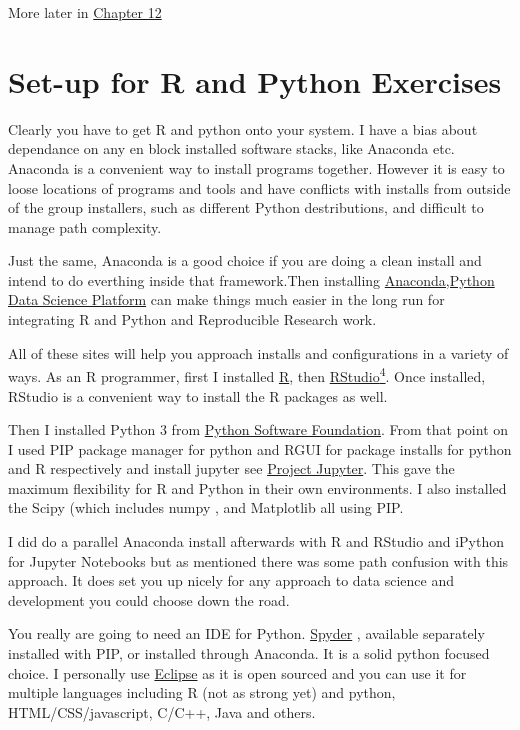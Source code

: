 \documentclass[]{book}
\theoremstyle{definition}
\theoremstyle{definition}
\theoremstyle{definition}
\theoremstyle{remark}
\begin{document}
More later in \href{12-OO_Programming.Rmd}{Chapter 12}

\chapter{Set-up for R and Python
Exercises}\label{set-up-for-r-and-python-exercises}

Clearly you have to get R and python onto your system. I have a bias
about dependance on any en block installed software stacks, like
Anaconda etc. Anaconda is a convenient way to install programs together.
However it is easy to loose locations of programs and tools and have
conflicts with installs from outside of the group installers, such as
different Python destributions, and difficult to manage path complexity.

Just the same, Anaconda is a good choice if you are doing a clean
install and intend to do everthing inside that framework.Then installing
\href{https://www.anaconda.com/}{Anaconda,Python Data Science Platform}
can make things much easier in the long run for integrating R and Python
and Reproducible Research work.

All of these sites will help you approach installs and configurations in
a variety of ways. As an R programmer, first I installed
\href{https://www.r-project.org/}{R}, then
\href{https://www.rstudio.com/}{RStudio\textsuperscript{4}}. Once
installed, RStudio is a convenient way to install the R packages as
well.

Then I installed Python 3 from \href{https://www.python.org/}{Python
Software Foundation}. From that point on I used PIP package manager for
python and RGUI for package installs for python and R respectively and
install jupyter see \href{http://jupyter.org/install}{Project
Jupyter}. This gave the maximum flexibility for R
and Python in their own environments. I also installed the Scipy
 (which includes numpy , and Matplotlib
 all using PIP.

I did do a parallel Anaconda  install afterwards with R
and RStudio  and iPython  for Jupyter
Notebooks but as mentioned there was some path confusion with this
approach. It does set you up nicely for any approach to data science and
development you could choose down the road.

You really are going to need an IDE for Python.
\href{https://www.spyder-ide.org/}{Spyder} , available
separately installed with PIP, or installed through Anaconda. It is a
solid python focused choice. I personally use
\href{https://www.eclipse.org/}{Eclipse} as it is open
sourced and you can use it for multiple languages including R (not as
strong yet) and python, HTML/CSS/javascript, C/C++, Java and others.
\end{document}
